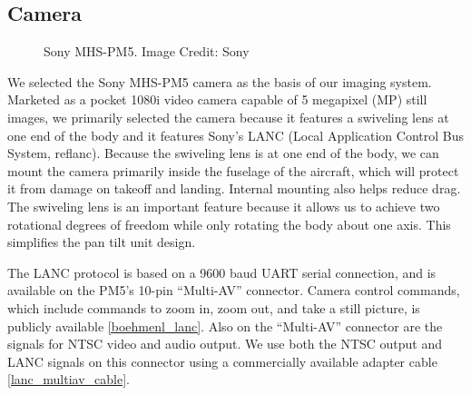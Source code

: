 \documentclass[10pt]{report}
\begin{document}
\subsection{Camera}
\begin{figure}
	\centering
	\caption{Sony MHS-PM5. Image Credit: Sony}
	\label{fig:camera}
\end{figure}

We selected the Sony MHS-PM5 camera as the basis of our imaging system. Marketed as a pocket 1080i video camera capable of 5 megapixel (MP) still images, we primarily selected the camera because it features a swiveling lens at one end of the body and it features Sony's LANC (Local Application Control Bus System, ref{lanc}). Because the swiveling lens is at one end of the body, we can mount the camera primarily inside the fuselage of the aircraft, which will protect it from damage on takeoff and landing. Internal mounting also helps reduce drag. The swiveling lens is an important feature because it allows us to achieve two rotational degrees of freedom while only rotating the body about one axis. This simplifies the pan tilt unit design.

The LANC protocol is based on a 9600 baud UART serial connection, and is available on the PM5's 10-pin ``Multi-AV'' connector. Camera control commands, which include commands to zoom in, zoom out, and take a still picture, is publicly available \ref{boehmenl_lanc}. Also on the ``Multi-AV'' connector are the signals for NTSC video and audio output. We use both the NTSC output and LANC signals on this connector using a commercially available adapter cable \ref{lanc_multiav_cable}.
\end{document}
